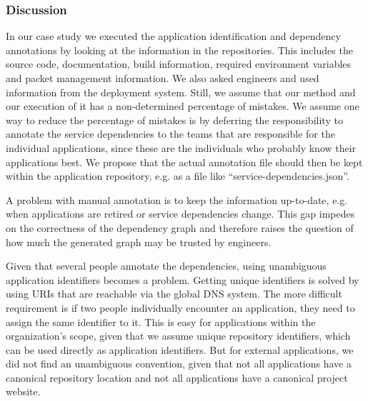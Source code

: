 \subsubsection{Discussion}

In our case study we executed the application identification and dependency annotations by looking at the information in the repositories. This includes the source code, documentation, build information, required environment variables and packet management information. We also asked engineers and used information from the deployment system. Still, we assume that our method and our execution of it has a non-determined percentage of mistakes. We assume one way to reduce the percentage of mistakes is by deferring the responsibility to annotate the service dependencies to the teams that are responsible for the individual applications, since these are the individuals who probably know their applications best. We propose that the actual annotation file should then be kept within the application repository, e.g. as a file like ``service-dependencies.json''.

A problem with manual annotation is to keep the information up-to-date, e.g. when applications are retired or service dependencies change. This gap impedes on the correctness of the dependency graph and therefore raises the question of how much the generated graph may be trusted by engineers.


Given that several people annotate the dependencies, using unambiguous application identifiers becomes a problem. Getting unique identifiers is solved by using URIs that are reachable via the global DNS system. The more difficult requirement is if two people individually encounter an application, they need to assign the same identifier to it. This is easy for applications within the organization's scope, given that we assume unique repository identifiers, which can be used directly as application identifiers. But for external applications, we did not find an unambiguous convention, given that not all applications have a canonical repository location and not all applications have a canonical project website.

